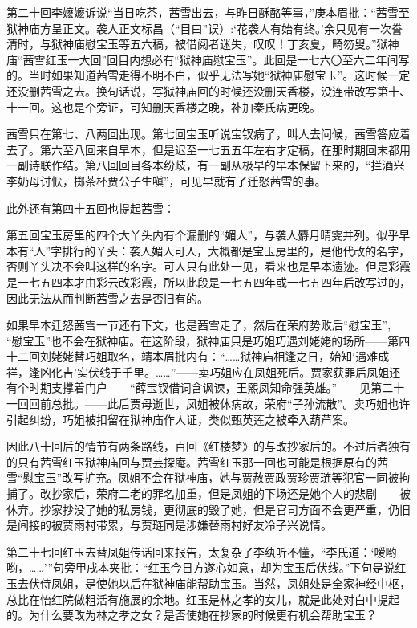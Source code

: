 \par 第二十回李嬷嬷诉说“当日吃茶，茜雪出去，与昨日酥酪等事，”庚本眉批：“茜雪至狱神庙方呈正文。袭人正文标昌（“目曰”误）:‘花袭人有始有终。’余只见有一次誊清时，与狱神庙慰宝玉等五六稿，被借阅者迷失，叹叹！丁亥夏，畸笏叟。”狱神庙“茜雪红玉一大回”回目内想必有“狱神庙慰宝玉”。此回是一七六〇至六二年间写的。当时如果知道茜雪走得不明不白，似乎无法写她“狱神庙慰宝玉”。这时候一定还没删茜雪之去。换句话说，写狱神庙回的时候还没删天香楼，没连带改写第十、十一回。这也是个旁证，可知删天香楼之晚，补加秦氏病更晚。
\par 茜雪只在第七、八两回出现。第七回宝玉听说宝钗病了，叫人去问候，茜雪答应着去了。第六至八回来自早本，但是迟至一七五五年左右才定稿，在那时期回末都用一副诗联作结。第八回回目各本纷歧，有一副从极早的早本保留下来的，“拦酒兴李奶母讨恹，掷茶杯贾公子生嗔”，可见早就有了迁怒茜雪的事。
\par 此外还有第四十五回也提起茜雪：
\par 第五回宝玉房里的四个大丫头内有个漏删的“媚人”，与袭人麝月晴雯并列。似乎早本有“人”字排行的丫头：袭人媚人可人，大概都是宝玉房里的，是他代改的名字，否则丫头决不会叫这样的名字。可人只有此处一见，看来也是早本遗迹。但是彩霞是一七五四本才由彩云改彩霞，所以此段是一七五四年或一七五四年后改写过的，因此无法从而判断茜雪之去是否旧有的。
\par 如果早本迁怒茜雪一节还有下文，也是茜雪走了，然后在荣府势败后“慰宝玉”, “慰宝玉”也不会在狱神庙。在这阶段，狱神庙只是巧姐巧遇刘姥姥的场所——第四十二回刘姥姥替巧姐取名，靖本眉批内有：“……狱神庙相逢之日，始知‘遇难成祥，逢凶化吉’实伏线于千里。……”——卖巧姐应在凤姐死后。贾家获罪后凤姐还有个时期支撑着门户——“薛宝钗借词含讽谏，王熙凤知命强英雄。”——见第二十一回回前总批。——此后贾母逝世，凤姐被休病故，荣府“子孙流散”。卖巧姐也许引起纠纷，巧姐被扣留在狱神庙作人证，类似甄英莲之被牵入葫芦案。
\par 因此八十回后的情节有两条路线，百回《红楼梦》的与改抄家后的。不过后者独有的只有茜雪红玉狱神庙回与贾芸探庵。茜雪红玉那一回也可能是根据原有的茜雪“慰宝玉”改写扩充。凤姐不会在狱神庙，她与贾赦贾政贾珍贾琏等犯官一同被拘捕了。改抄家后，荣府二老的罪名加重，但是凤姐的下场还是她个人的悲剧——被休弃。抄家抄没了她的私房钱，更彻底的毁了她，但是官司方面不会更严重，仍旧是间接的被贾雨村带累，与贾琏同是涉嫌替雨村好友冷子兴说情。
\par 第二十七回红玉去替凤姐传话回来报告，太复杂了李纨听不懂，“李氏道：‘嗳哟哟，……'”句旁甲戌本夹批：“红玉今日方遂心如意，却为宝玉后伏线。”下句是说红玉去伏侍凤姐，是使她以后在狱神庙能帮助宝玉。当然，凤姐处是全家神经中枢，总比在怡红院做粗活有施展的余地。红玉是林之孝的女儿，就是此处对白中提起的。为什么要改为林之孝之女？是否使她在抄家的时候更有机会帮助宝玉？
